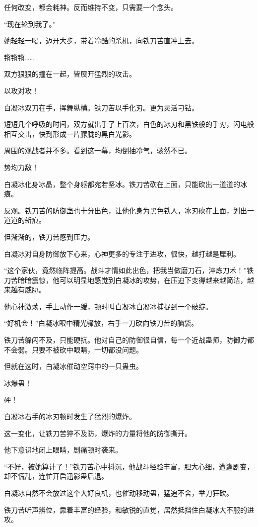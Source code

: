\begin{this_body}
任何改变，都会耗神。反而维持不变，只需要一个念头。

“现在轮到我了。”

她轻轻一喝，迈开大步，带着冷酷的杀机，向铁刀苦直冲上去。

锵锵锵……

双方狠狠的撞在一起，皆展开猛烈的攻击。

以攻对攻！

白凝冰双刀在手，挥舞纵横。铁刀苦以手化刃。更为灵活刁钻。

短短几个呼吸的时间，双方就出手了上百次，白色的冰刃和黑铁般的手刃，闪电般相互交击，快到形成一片朦胧的黑白光影。

周围的观战者并不多。看到这一幕，均倒抽冷气，骇然不已。

势均力敌！

白凝冰化身冰晶，整个身躯都宛若坚冰。铁刀苦砍在上面，只能砍出一道道的冰痕。

反观。铁刀苦的防御蛊也十分出色，让他化身为黑色铁人，冰刃砍在上面，划出一道道的斩痕。

但渐渐的，铁刀苦感到压力。

白凝冰对自身防御放下心来，心神更多的专注于进攻，很快，越打越是犀利。

“这个家伙，竟然临阵提高。战斗才情如此出色，把我当做磨刀石，淬炼刀术！”铁刀苦暗暗震惊，他可以明显地感觉到白凝冰的攻势，在压迫下变得越来越简洁，越来越有威胁。

他心神激荡，手上动作一缓，顿时叫白凝冰白凝冰捕捉到一个破绽。

“好机会！”白凝冰眼中精光骤放，右手一刀砍向铁刀苦的脑袋。

铁刀苦躲闪不及，只能硬抗。他对自己的防御很自信，每一个近战蛊师，防御力都不会弱。只要不被砍中眼睛，一切都没问题。

但就在这时，白凝冰催动空窍中的一只蛊虫。

冰爆蛊！

砰！

白凝冰右手的冰刃顿时发生了猛烈的爆炸。

这一变化，让铁刀苦猝不及防，爆炸的力量将他的防御撕开。

他下意识地闭上眼睛，剧痛顿时袭来。

“不好，被她算计了！”铁刀苦心中抖沉，他战斗经验丰富，胆大心细，遭逢剧变，却不慌乱，连忙开启迅影蛊后退。

白凝冰自然不会放过这个大好良机，也催动移动蛊，猛追不舍，举刀狂砍。

铁刀苦听声辨位，靠着丰富的经验，和敏锐的直觉，居然抵挡住白凝冰大不服的进攻。


\end{this_body}
